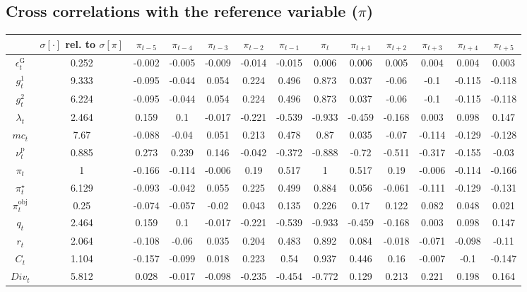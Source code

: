 \subsection{Cross correlations with the reference variable ($\pi$)}

\begin{tabular}{c|c|c|c|c|c|c|c|c|c|c|c|c|}
  & $\sigma[\cdot]$ rel. to $\sigma[\pi]$ & $\pi_{t-5}$ & $\pi_{t-4}$ & $\pi_{t-3}$ & $\pi_{t-2}$ & $\pi_{t-1}$ & $\pi_{t}$ & $\pi_{t+1}$ & $\pi_{t+2}$ & $\pi_{t+3}$ & $\pi_{t+4}$ & $\pi_{t+5}$\\
\hline
$\epsilon^{\mathrm{G}}_{t}$ & 0.252 & -0.002 & -0.005 & -0.009 & -0.014 & -0.015 & 0.006 & 0.006 & 0.005 & 0.004 & 0.004 & 0.003 \\
$g^{\mathrm{1}}_{t}$ & 9.333 & -0.095 & -0.044 & 0.054 & 0.224 & 0.496 & 0.873 & 0.037 & -0.06 & -0.1 & -0.115 & -0.118 \\
$g^{\mathrm{2}}_{t}$ & 6.224 & -0.095 & -0.044 & 0.054 & 0.224 & 0.496 & 0.873 & 0.037 & -0.06 & -0.1 & -0.115 & -0.118 \\
$\lambda_{t}$ & 2.464 & 0.159 & 0.1 & -0.017 & -0.221 & -0.539 & -0.933 & -0.459 & -0.168 & 0.003 & 0.098 & 0.147 \\
${m\!c}_{t}$ & 7.67 & -0.088 & -0.04 & 0.051 & 0.213 & 0.478 & 0.87 & 0.035 & -0.07 & -0.114 & -0.129 & -0.128 \\
$\nu^{\mathrm{p}}_{t}$ & 0.885 & 0.273 & 0.239 & 0.146 & -0.042 & -0.372 & -0.888 & -0.72 & -0.511 & -0.317 & -0.155 & -0.03 \\
$\pi_{t}$ & 1 & -0.166 & -0.114 & -0.006 & 0.19 & 0.517 & 1 & 0.517 & 0.19 & -0.006 & -0.114 & -0.166 \\
$\pi^{\star}_{t}$ & 6.129 & -0.093 & -0.042 & 0.055 & 0.225 & 0.499 & 0.884 & 0.056 & -0.061 & -0.111 & -0.129 & -0.131 \\
$\pi^{\mathrm{obj}}_{t}$ & 0.25 & -0.074 & -0.057 & -0.02 & 0.043 & 0.135 & 0.226 & 0.17 & 0.122 & 0.082 & 0.048 & 0.021 \\
$q_{t}$ & 2.464 & 0.159 & 0.1 & -0.017 & -0.221 & -0.539 & -0.933 & -0.459 & -0.168 & 0.003 & 0.098 & 0.147 \\
$r_{t}$ & 2.064 & -0.108 & -0.06 & 0.035 & 0.204 & 0.483 & 0.892 & 0.084 & -0.018 & -0.071 & -0.098 & -0.11 \\
$C_{t}$ & 1.104 & -0.157 & -0.099 & 0.018 & 0.223 & 0.54 & 0.937 & 0.446 & 0.16 & -0.007 & -0.1 & -0.147 \\
${D\!i\!v}_{t}$ & 5.812 & 0.028 & -0.017 & -0.098 & -0.235 & -0.454 & -0.772 & 0.129 & 0.213 & 0.221 & 0.198 & 0.164 \\

\end{tabular}
